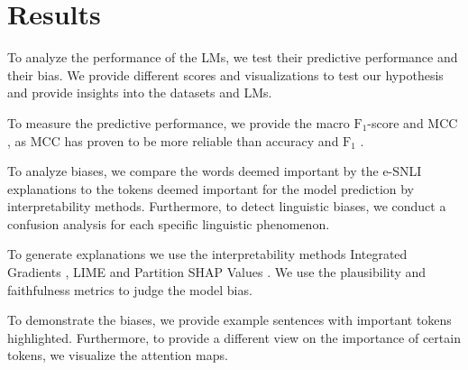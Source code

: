 \section{Results} \label{sec:results}

To analyze the performance of the \acp{LM}, we test their predictive performance and their bias. We provide different scores and visualizations to test our hypothesis and provide insights into the datasets and \acp{LM}.

To measure the predictive performance, we provide the macro $\text{F}_1$-score \cite{macrof1} and \ac{MCC} \cite{mcc}, as \ac{MCC} has proven to be more reliable than accuracy and $\text{F}_1$ \cite{mccGood}.

To analyze biases, we compare the words deemed important by the \ac{e-SNLI} explanations to the tokens deemed important for the model prediction by interpretability methods. Furthermore, to detect linguistic biases, we conduct a confusion analysis for each specific linguistic phenomenon.

To generate explanations we use the interpretability methods Integrated Gradients \cite{integratedgradients}, \ac{LIME} \cite{lime} and Partition SHAP Values \cite{shap}. We use the plausibility and faithfulness \cite{ferret} metrics to judge the model bias.

To demonstrate the biases, we provide example sentences with important tokens highlighted. Furthermore, to provide a different view on the importance of certain tokens, we visualize the attention maps.